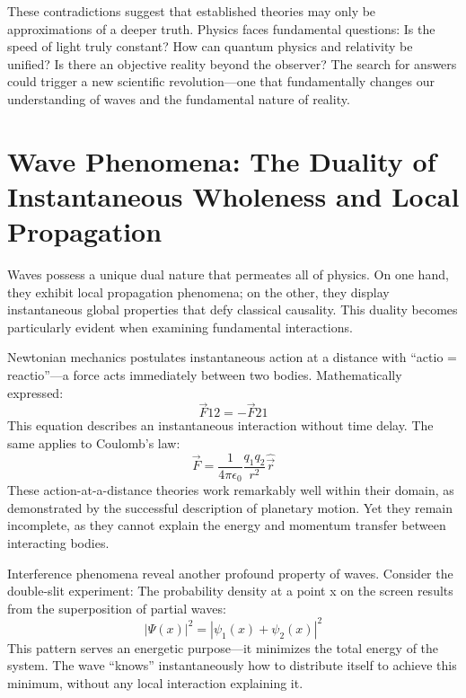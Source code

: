 These contradictions suggest that established theories may only be approximations of a deeper truth. Physics faces fundamental questions: Is the speed of light
truly constant? How can quantum physics and relativity be unified? Is there an objective reality beyond the observer? The search for answers could trigger a new scientific
revolution—one that fundamentally changes our understanding of waves and the fundamental nature of reality.

\section{Wave Phenomena: The Duality of Instantaneous Wholeness and Local Propagation}
Waves possess a unique dual nature that permeates all of physics. On one hand, they exhibit local propagation phenomena; on the other, they display instantaneous global
properties that defy classical causality. This duality becomes particularly evident when examining fundamental interactions.

Newtonian mechanics postulates instantaneous action at a distance with \enquote{actio = reactio}—a force acts immediately between two bodies. Mathematically expressed:
\begin{equation}
    \vec{F}{12} = -\vec{F}{21}
\end{equation}
This equation describes an instantaneous interaction without time delay. The same applies to Coulomb's law:
\begin{equation}
    \vec{F} = \frac{1}{4\pi\epsilon_0}\frac{q_1q_2}{r^2}\hat{\vec{r}}
\end{equation}
These action-at-a-distance theories work remarkably well within their domain, as demonstrated by the successful description of planetary motion. Yet they remain incomplete,
as they cannot explain the energy and momentum transfer between interacting bodies.

Interference phenomena reveal another profound property of waves. Consider the double-slit experiment: The probability density at a point x on the
screen results from the superposition of partial waves:
\begin{equation}
    |\Psi(x)|^2 = |\psi_1(x) + \psi_2(x)|^2
\end{equation}
This pattern serves an energetic purpose—it minimizes the total energy of the system. The wave \enquote{knows} instantaneously how to distribute itself to achieve this minimum,
without any local interaction explaining it.

